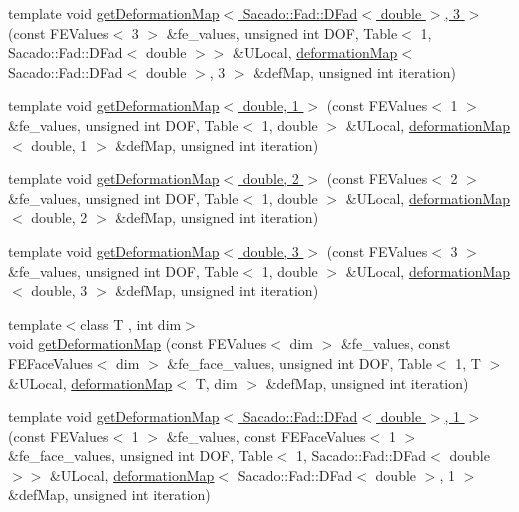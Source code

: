 \begin{DoxyCompactItemize}
\item 
template void \hyperlink{function_evaluations_8cc_aed838368af3e1f968a4234eb18bee8e8}{get\-Deformation\-Map$<$ Sacado\-::\-Fad\-::\-D\-Fad$<$ double $>$, 3 $>$} (const F\-E\-Values$<$ 3 $>$ \&fe\-\_\-values, unsigned int D\-O\-F, Table$<$ 1, Sacado\-::\-Fad\-::\-D\-Fad$<$ double $>$$>$ \&U\-Local, \hyperlink{structdeformation_map}{deformation\-Map}$<$ Sacado\-::\-Fad\-::\-D\-Fad$<$ double $>$, 3 $>$ \&def\-Map, unsigned int iteration)
\item 
template void \hyperlink{function_evaluations_8cc_a4e726f8c8f17b338819f30946e6d4274}{get\-Deformation\-Map$<$ double, 1 $>$} (const F\-E\-Values$<$ 1 $>$ \&fe\-\_\-values, unsigned int D\-O\-F, Table$<$ 1, double $>$ \&U\-Local, \hyperlink{structdeformation_map}{deformation\-Map}$<$ double, 1 $>$ \&def\-Map, unsigned int iteration)
\item 
template void \hyperlink{function_evaluations_8cc_a934f34bca13586e71d79d67e2d405170}{get\-Deformation\-Map$<$ double, 2 $>$} (const F\-E\-Values$<$ 2 $>$ \&fe\-\_\-values, unsigned int D\-O\-F, Table$<$ 1, double $>$ \&U\-Local, \hyperlink{structdeformation_map}{deformation\-Map}$<$ double, 2 $>$ \&def\-Map, unsigned int iteration)
\item 
template void \hyperlink{function_evaluations_8cc_a9d25cc478ac60031a64a48a1687fabc2}{get\-Deformation\-Map$<$ double, 3 $>$} (const F\-E\-Values$<$ 3 $>$ \&fe\-\_\-values, unsigned int D\-O\-F, Table$<$ 1, double $>$ \&U\-Local, \hyperlink{structdeformation_map}{deformation\-Map}$<$ double, 3 $>$ \&def\-Map, unsigned int iteration)
\item 
{\footnotesize template$<$class T , int dim$>$ }\\void \hyperlink{group___evaluation_functions_ga239b206235603af9482484c29c8d57ea}{get\-Deformation\-Map} (const F\-E\-Values$<$ dim $>$ \&fe\-\_\-values, const F\-E\-Face\-Values$<$ dim $>$ \&fe\-\_\-face\-\_\-values, unsigned int D\-O\-F, Table$<$ 1, T $>$ \&U\-Local, \hyperlink{structdeformation_map}{deformation\-Map}$<$ T, dim $>$ \&def\-Map, unsigned int iteration)
\item 
template void \hyperlink{function_evaluations_8cc_ae3b81f1c251c883431db31f41eb1c340}{get\-Deformation\-Map$<$ Sacado\-::\-Fad\-::\-D\-Fad$<$ double $>$, 1 $>$} (const F\-E\-Values$<$ 1 $>$ \&fe\-\_\-values, const F\-E\-Face\-Values$<$ 1 $>$ \&fe\-\_\-face\-\_\-values, unsigned int D\-O\-F, Table$<$ 1, Sacado\-::\-Fad\-::\-D\-Fad$<$ double $>$$>$ \&U\-Local, \hyperlink{structdeformation_map}{deformation\-Map}$<$ Sacado\-::\-Fad\-::\-D\-Fad$<$ double $>$, 1 $>$ \&def\-Map, unsigned int iteration)

\end{DoxyCompactItemize}
